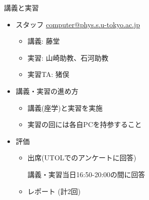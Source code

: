 \begin{frame}[t,fragile]{講義と実習}
  \begin{itemize}
  \item スタッフ \href{mailto:computer@phys.s.u-tokyo.ac.jp}{computer@phys.s.u-tokyo.ac.jp}
    \begin{itemize}
    \item 講義: 藤堂
    \item 実習: 山崎助教、石河助教
    \item 実習TA: 猪俣
    \end{itemize}
  \item 講義・実習の進め方
    \begin{itemize}
    \item 講義(座学)と実習を実施
    \item 実習の回には各自PCを持参すること
    \end{itemize}
  \item 評価
    \begin{itemize}
    \item 出席(UTOLでのアンケートに回答)

      講義・実習当日16:50-20:00の間に回答
      
    \item レポート (計2回)
    \end{itemize}    
  \end{itemize}    
\end{frame}
